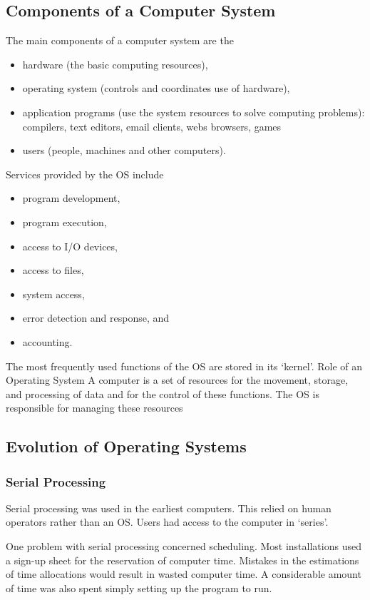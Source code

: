 \subsection{Components of a Computer System}

The main components of a computer system are the
\begin{itemize}
  \item hardware (the basic computing resources),
  \item operating system (controls and coordinates use of hardware),
  \item application programs (use the system resources to solve computing problems): compilers, text editors, email clients, webs browsers, games
  \item users (people, machines and other computers).
\end{itemize}

Services provided by the OS include
\begin{itemize}
  \item program development,
  \item program execution,
  \item access to I/O devices,
  \item access to files,
  \item system access,
  \item error detection and response, and
  \item accounting.
\end{itemize}
The most frequently used functions of the OS are stored in its `kernel'.
Role of an Operating System
A computer is a set of resources for the movement, storage, and processing of data and for the control of these functions.
The OS is responsible for managing these resources

\subsection{Evolution of Operating Systems}

\subsubsection{Serial Processing}

Serial processing was used in the earliest computers.
This relied on human operators rather than an OS\@.
Users had access to the computer in `series'.

One problem with serial processing concerned scheduling.
Most installations used a sign-up sheet for the reservation of computer time.
Mistakes in the estimations of time allocations would result in wasted computer time.
A considerable amount of time was also spent simply setting up the program to run.

